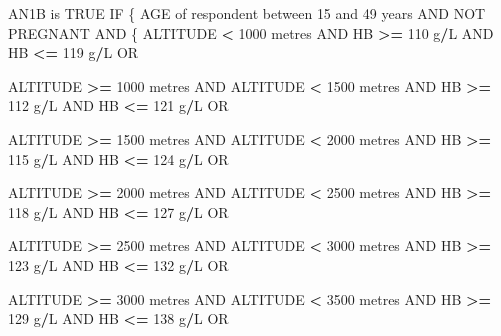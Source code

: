 \documentclass[12pt,a4paper]{article}
\newenvironment{Shaded}{\begin{snugshade}}{\end{snugshade}}
\newcommand{\DecValTok}[1]{\textcolor[rgb]{0.00,0.00,0.81}{#1}}
\newcommand{\NormalTok}[1]{#1}
\newcommand{\OperatorTok}[1]{\textcolor[rgb]{0.81,0.36,0.00}{\textbf{#1}}}
\newcommand{\OtherTok}[1]{\textcolor[rgb]{0.56,0.35,0.01}{#1}}
\newcommand{\StringTok}[1]{\textcolor[rgb]{0.31,0.60,0.02}{#1}}
\begin{document}
\begin{Shaded}
\begin{Highlighting}[]
\NormalTok{AN1B is }\OtherTok{TRUE}\NormalTok{ IF}
\NormalTok{  \{}
\NormalTok{    AGE of respondent between }\DecValTok{15}\NormalTok{ and }\DecValTok{49}\NormalTok{ years AND NOT PREGNANT AND}
\NormalTok{      \{}
\NormalTok{        ALTITUDE }\OperatorTok{<}\StringTok{ }\DecValTok{1000}\NormalTok{ metres AND HB }\OperatorTok{>=}\StringTok{ }\DecValTok{110}\NormalTok{ g}\OperatorTok{/}\NormalTok{L AND HB }\OperatorTok{<=}\StringTok{ }\DecValTok{119}\NormalTok{ g}\OperatorTok{/}\NormalTok{L OR}
    
\NormalTok{        ALTITUDE }\OperatorTok{>=}\StringTok{ }\DecValTok{1000}\NormalTok{ metres AND ALTITUDE }\OperatorTok{<}\StringTok{ }\DecValTok{1500}\NormalTok{ metres AND }
\NormalTok{          HB }\OperatorTok{>=}\StringTok{ }\DecValTok{112}\NormalTok{ g}\OperatorTok{/}\NormalTok{L AND HB }\OperatorTok{<=}\StringTok{ }\DecValTok{121}\NormalTok{ g}\OperatorTok{/}\NormalTok{L OR}
    
\NormalTok{        ALTITUDE }\OperatorTok{>=}\StringTok{ }\DecValTok{1500}\NormalTok{ metres AND ALTITUDE }\OperatorTok{<}\StringTok{ }\DecValTok{2000}\NormalTok{ metres AND }
\NormalTok{          HB }\OperatorTok{>=}\StringTok{ }\DecValTok{115}\NormalTok{ g}\OperatorTok{/}\NormalTok{L AND HB }\OperatorTok{<=}\StringTok{ }\DecValTok{124}\NormalTok{ g}\OperatorTok{/}\NormalTok{L OR}
    
\NormalTok{        ALTITUDE }\OperatorTok{>=}\StringTok{ }\DecValTok{2000}\NormalTok{ metres AND ALTITUDE }\OperatorTok{<}\StringTok{ }\DecValTok{2500}\NormalTok{ metres AND }
\NormalTok{          HB }\OperatorTok{>=}\StringTok{ }\DecValTok{118}\NormalTok{ g}\OperatorTok{/}\NormalTok{L AND HB }\OperatorTok{<=}\StringTok{ }\DecValTok{127}\NormalTok{ g}\OperatorTok{/}\NormalTok{L OR}
    
\NormalTok{        ALTITUDE }\OperatorTok{>=}\StringTok{ }\DecValTok{2500}\NormalTok{ metres AND ALTITUDE }\OperatorTok{<}\StringTok{ }\DecValTok{3000}\NormalTok{ metres AND }
\NormalTok{          HB }\OperatorTok{>=}\StringTok{ }\DecValTok{123}\NormalTok{ g}\OperatorTok{/}\NormalTok{L AND HB }\OperatorTok{<=}\StringTok{ }\DecValTok{132}\NormalTok{ g}\OperatorTok{/}\NormalTok{L OR}
    
\NormalTok{        ALTITUDE }\OperatorTok{>=}\StringTok{ }\DecValTok{3000}\NormalTok{ metres AND ALTITUDE }\OperatorTok{<}\StringTok{ }\DecValTok{3500}\NormalTok{ metres AND }
\NormalTok{          HB }\OperatorTok{>=}\StringTok{ }\DecValTok{129}\NormalTok{ g}\OperatorTok{/}\NormalTok{L AND HB }\OperatorTok{<=}\StringTok{ }\DecValTok{138}\NormalTok{ g}\OperatorTok{/}\NormalTok{L OR}
    

\end{Highlighting}
\end{Shaded}
\end{document}
